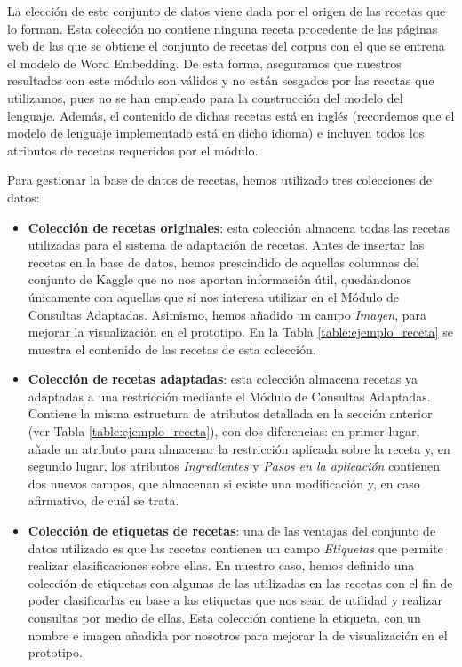 La elección de este conjunto de datos viene dada por el origen de las recetas que lo forman. Esta colección no contiene ninguna receta procedente de las páginas web de las que se obtiene el conjunto de recetas del corpus con el que se entrena el modelo de Word Embedding. De esta forma, aseguramos que nuestros resultados con este módulo son válidos y no están sesgados por las recetas que utilizamos, pues no se han empleado para la construcción del modelo del lenguaje. Además, el contenido de dichas recetas está en inglés (recordemos que el modelo de lenguaje implementado está en dicho idioma) e incluyen todos los atributos de recetas requeridos por el módulo.

Para gestionar la base de datos de recetas, hemos utilizado tres colecciones de datos:
\begin{itemize}
    \item \textbf{Colección de recetas originales}: esta colección almacena todas las recetas utilizadas para el sistema de adaptación de recetas. Antes de insertar las recetas en la base de datos, hemos prescindido de aquellas columnas del conjunto de Kaggle que no nos aportan información útil, quedándonos únicamente con aquellas que sí nos interesa utilizar en el Módulo de Consultas Adaptadas. Asimismo, hemos añadido un campo \textit{Imagen}, para mejorar la visualización en el prototipo. En la Tabla \ref{table:ejemplo_receta} se muestra el contenido de las recetas de esta colección.
    
    \item \textbf{Colección de recetas adaptadas}: esta colección almacena recetas ya adaptadas a una restricción mediante el Módulo de Consultas Adaptadas. Contiene la misma estructura de atributos detallada en la sección anterior (ver Tabla \ref{table:ejemplo_receta}), con dos diferencias: en primer lugar, añade un atributo para almacenar la restricción aplicada sobre la receta y, en segundo lugar, los atributos \textit{Ingredientes} y \textit{Pasos en la aplicación} contienen dos nuevos campos, que almacenan si existe una modificación y, en caso afirmativo, de cuál se trata.
    
    \item \textbf{Colección de etiquetas de recetas}: una de las ventajas del conjunto de datos utilizado es que las recetas contienen un campo \textit{Etiquetas} que permite realizar clasificaciones sobre ellas. En nuestro caso, hemos definido una colección de etiquetas con algunas de las utilizadas en las recetas con el fin de poder clasificarlas en base a las etiquetas que nos sean de utilidad y realizar consultas por medio de ellas. Esta colección contiene la etiqueta, con un nombre e imagen añadida por nosotros para mejorar la de visualización en el prototipo.
    
\end{itemize}

